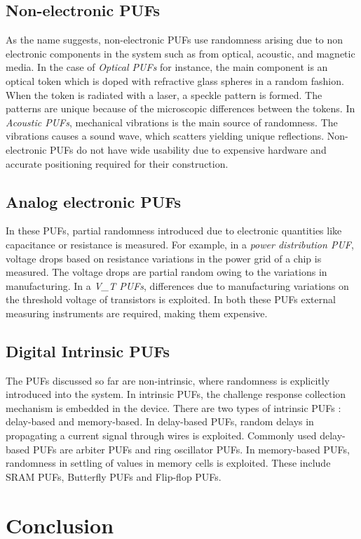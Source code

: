 \subsection{Non-electronic PUFs}
As the name suggests, non-electronic PUFs use randomness arising due to non electronic components in the system
such as from optical, acoustic, and magnetic media. In the case of \textit{Optical PUFs} for instance, the main 
component is an optical token which is doped with refractive glass spheres in a random fashion. When the token is 
radiated with a laser, a speckle pattern is formed. The patterns are  unique because  of the microscopic differences 
between the tokens. In \textit{Acoustic PUFs}, mechanical vibrations is the main source of
randomness. The vibrations causes a sound wave, which scatters yielding unique reflections. 
Non-electronic PUFs do not have wide usability due to expensive hardware and accurate positioning 
required for their construction.

\subsection{Analog electronic PUFs}
In these PUFs, partial randomness introduced due to electronic quantities like capacitance or 
resistance is measured. 
For example, in a \textit{power distribution PUF}, voltage drops based on resistance variations
in the power grid of a chip is measured. The voltage drops are partial random owing to the
variations in manufacturing. In a \textit{V\_T PUFs}, differences due to manufacturing variations
on the threshold voltage of transistors is exploited. In both these PUFs external measuring instruments
are required, making them expensive.


\subsection{Digital Intrinsic PUFs}
The PUFs discussed so far are non-intrinsic, where randomness is explicitly introduced into the
system. In intrinsic PUFs, the challenge response 
collection mechanism is embedded in the device. There are two types of intrinsic PUFs :
delay-based and memory-based. In delay-based PUFs, random delays in propagating a current signal
through wires is exploited. Commonly used delay-based PUFs are arbiter PUFs and ring oscillator 
PUFs. In memory-based PUFs, randomness in settling of values in memory cells is exploited. 
These include SRAM PUFs, Butterfly PUFs and Flip-flop PUFs.



\section{Conclusion}
